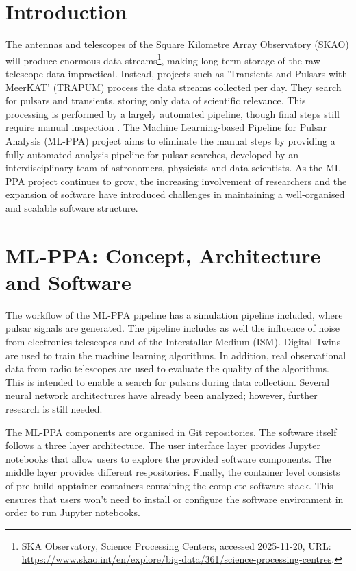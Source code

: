 \documentclass[11pt,twoside]{article}
\begin{document}
\section{Introduction}
The antennas and telescopes of the Square Kilometre Array Observatory (SKAO) will produce enormous data streams\footnote{SKA Observatory, Science Processing Centers, accessed 2025-11-20, URL: \url{https://www.skao.int/en/explore/big-data/361/science-processing-centres}.},
making long-term storage of the raw telescope data impractical. 
Instead, projects such as 'Transients and Pulsars with MeerKAT' (TRAPUM) process the data streams collected per day. They search for pulsars and transients, storing only data of scientific relevance. This processing is performed by a largely automated pipeline, though final steps still require manual inspection \citep{TRAPUM}.
The Machine Learning-based Pipeline for Pulsar Analysis (ML-PPA) project aims to eliminate the manual steps by providing a fully automated analysis pipeline for pulsar searches, developed by an interdisciplinary team of astronomers, physicists and data scientists.
As the ML-PPA project continues to grow, the increasing involvement of researchers and the expansion of software have introduced challenges in maintaining a well-organised and scalable software structure. 

\section{ML-PPA: Concept, Architecture and Software}
The workflow of the ML-PPA pipeline has a simulation pipeline included, where pulsar signals are generated. The pipeline includes as well the influence of noise from electronics telescopes and of the Interstallar Medium (ISM). 
Digital Twins are used to train the machine learning algorithms. In addition, real observational data from radio telescopes are used to evaluate the quality of the algorithms.  
This is intended to enable a search for pulsars during data collection.
Several neural network architectures have already been analyzed; however, further research is still needed. 

The ML-PPA components are organised in Git repositories. The software itself follows a three layer architecture. The user interface layer provides Jupyter notebooks that allow users to explore the provided software components. The middle layer provides different respositories. Finally, the container level consists of pre-build apptainer containers containing the complete software stack. This ensures that users won't need to install or configure the software environment  in order to run Jupyter notebooks.
\end{document}
